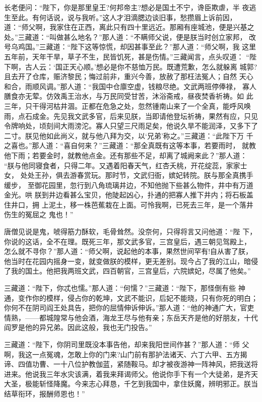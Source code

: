 长老便问：“陛下，你是那里皇王?何邦帝主?想必是国土不宁，谗臣欺虐，半
夜逃生至此。有何话说，说与我听。”这人才泪滴腮边谈旧事，愁攒眉上诉前因，
道：“师父啊，我家住在正西，离此只有四十里远近。那厢有座城池，便是兴基之
处。”三藏道：“叫做甚么地名？”那人道：“不瞒师父说，便是朕当时创立家邦，
改号乌鸡国。”三藏道：“陛下这等惊慌，却因甚事至此？”那人道：“师父啊，我
这里五年前，天年干旱，草子不生，民皆饥死，甚是伤情。”三藏闻言，点头叹道：
“陛下啊，古人云：‘国正天心顺。’想必是你不慈恤万民。既遭荒歉，怎么就躲离
城郭?且去开了仓库，赈济黎民；悔过前非，重兴今善，放赦了那枉法冤人；自然
天心和合，雨顺风调。”那人道：“我国中仓廪空虚，钱粮尽绝。文武两班停俸禄，
寡人膳食亦无荤。仿效禹王治水，与万民同受甘苦，沐浴斋戒，昼夜焚香祈祷。如
此三年，只干得河枯井涸。正都在危急之处，忽然锺南山来了一个全真，能呼风唤
雨，点石成金。先见我文武多官，后来见朕，当即请他登坛祈祷，果然有应，只见
令牌响处，顷刻间大雨滂沱。寡人只望三尺雨足矣，他说久旱不能润泽，又多下了
二寸。朕见他如此尚义，就与他八拜为交，以‘兄弟’称之。”三藏道：“此陛下万
千之喜也。”那人道：“喜自何来？”三藏道：“那全真既有这等本事，若要雨时，
就教他下雨；若要金时，就教他点金。还有那些不足，却离了城阙来此？”那人道：
“朕与他同寝食者，只得二年。又遇着阳春天气，红杏夭桃，开花绽蕊，家家士女，
处处王孙，俱去游春赏玩。那时节，文武归衙，嫔妃转院。朕与那全真携手缓步，
至御花园里，忽行到八角琉璃井边，不知他抛下些甚么物件，井中有万道金光。哄
朕到井边看甚么宝贝，他陡起凶心，扑通的把寡人推下井内；将石板盖住井口，拥
上泥土，移一株芭蕉栽在上面。可怜我啊，已死去三年，是一个落井伤生的冤屈之
鬼也！”

唐僧见说是鬼，唬得筋力酥软，毛骨耸然。没奈何，只得将言又问他道：“陛
下，你说的这话，全不在理。既死三年，那文武多官，三宫皇后，遇三朝见驾殿上，
怎么就不寻你？”那人道：“师父啊，说起他的本事，果然世间罕有!自从害了朕，
他当时在花园内摇身一变，就变做朕的模样，更无差别。现今占了我的江山，暗侵
了我的国土。他把我两班文武，四百朝官，三宫皇后，六院嫔妃，尽属了他矣。”

三藏道：“陛下，你忒也懦。”那人道：“何懦？”三藏道：“陛下，那怪倒有些
神通，变作你的模样，侵占你的乾坤，文武不能识，后妃不能晓，只有你死的明白；
你何不在阴司阎王处具告，把你的屈情伸诉伸诉。”那人道：“他的神通广大，官吏
情熟，——都城隍常与他会酒，海龙王尽与他有亲；东岳天齐是他的好朋友，十代
阎罗是他的异兄弟。因此这般，我也无门投告。”

三藏道：“陛下，你阴司里既没本事告他，却来我阳世间作甚？”那人道：“师
父啊，我这一点冤魂，怎敢上你的门来?山门前有那护法诸天、六丁六甲、五方揭
谛、四值功曹、一十八位护教伽蓝，紧随鞍马。却才被夜游神一阵神风，把我送将
进来。他说我三年水灾该满，着我来拜谒师父。他说你手下有一个大徒弟，是齐天
大圣，极能斩怪降魔。今来志心拜恳，千乞到我国中，拿住妖魔，辨明邪正。朕当
结草衔环，报酬师恩也！”

